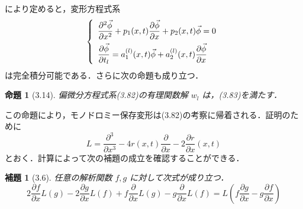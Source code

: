 \documentclass[paper=a4, fontsize=11pt]{jlreq} %
\newenvironment{story}{%
  \begin{mdframed}[
    backgroundcolor=red!5, %
    linewidth=0pt,         %
    innertopmargin=10pt,   %
    innerbottommargin=10pt,
    innerrightmargin=10pt, %
    innerleftmargin=10pt
  ]%
}{%
  \end{mdframed}%
}
\theoremstyle{break}
\newtheorem{proposition}[theorem]{命題}
\newtheorem{lemma}[theorem]{補題}
\theoremstyle{qa}
\begin{document}
\begin{story}
\begin{equation}
\end{equation}
により定めると，変形方程式系
\begin{equation}
\left\{
\begin{array}{l}
    \displaystyle \frac{\partial^2 \vec{\phi}}{\partial x^2} + p_1(x,t)\frac{\partial \vec{\phi}}{\partial x} + p_2(x,t)\vec{\phi} = 0 \vspace{0.5em} \\
    \displaystyle \frac{\partial \vec{\phi}}{\partial t_l} = a_1^{(l)}(x,t)\vec{\phi} + a_2^{(l)}(x,t)\frac{\partial \vec{\phi}}{\partial x}
\end{array}
\right. \label{eq:3.20}
\end{equation}
は完全積分可能である．さらに次の命題も成り立つ．

\begin{proposition}[3.14]
偏微分方程式系(3.82)の有理関数解 $w_l$ は，(3.83)を満たす．
\end{proposition}

この命題により，モノドロミー保存変形は(3.82)の考察に帰着される．証明のために
\begin{equation*}
    L = \frac{\partial^3}{\partial x^3} - 4r(x,t)\frac{\partial}{\partial x} - 2\frac{\partial r}{\partial x}(x,t)
\end{equation*}
とおく．計算によって次の補題の成立を確認することができる．

\begin{lemma}[3.6]
任意の解析関数 $f,g$ に対して次式が成り立つ．
\begin{equation*}
    2\frac{\partial f}{\partial x}L(g) - 2\frac{\partial g}{\partial x}L(f) + f\frac{\partial}{\partial x}L(g) - g\frac{\partial}{\partial x}L(f) = L\left( f\frac{\partial g}{\partial x} - g\frac{\partial f}{\partial x} \right)
\end{equation*}
\end{lemma}
\end{story}
\end{document}
